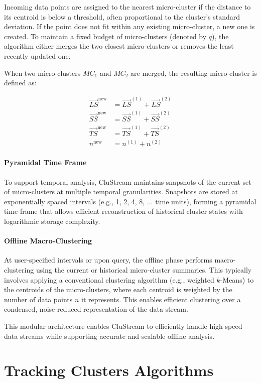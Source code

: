 Incoming data points are assigned to the nearest micro-cluster if the distance
to its centroid is below a threshold, often proportional to the cluster's
standard deviation. If the point does not fit within any existing
micro-cluster, a new one is created. To maintain a fixed budget of
micro-clusters (denoted by $q$), the algorithm either merges the two closest
micro-clusters or removes the least recently updated one.

When two micro-clusters $MC_1$ and $MC_2$ are merged, the resulting
micro-cluster is defined as:

\begin{align}
    \vec{LS}^{\text{new}} & = \vec{LS}^{(1)} + \vec{LS}^{(2)} \\
    \vec{SS}^{\text{new}} & = \vec{SS}^{(1)} + \vec{SS}^{(2)} \\
    \vec{TS}^{\text{new}} & = \vec{TS}^{(1)} + \vec{TS}^{(2)} \\
    n^{\text{new}}        & = n^{(1)} + n^{(2)}
\end{align}

\paragraph{Pyramidal Time Frame} To support temporal analysis, CluStream maintains snapshots of the current set
of micro-clusters at multiple temporal granularities. Snapshots are stored at
exponentially spaced intervals (e.g., 1, 2, 4, 8, $\dots$ time units), forming
a pyramidal time frame that allows efficient reconstruction of historical
cluster states with logarithmic storage complexity.

\paragraph{Offline Macro-Clustering} At user-specified intervals or upon query, the offline phase performs
macro-clustering using the current or historical micro-cluster summaries. This
typically involves applying a conventional clustering algorithm (e.g., weighted
$k$-Means) to the centroids of the micro-clusters, where each centroid is
weighted by the number of data points $n$ it represents. This enables efficient
clustering over a condensed, noise-reduced representation of the data stream.

This modular architecture enables CluStream to efficiently handle high-speed
data streams while supporting accurate and scalable offline analysis.

\section{Tracking Clusters Algorithms}\label{sec:tracking_clusters_algorithms}

